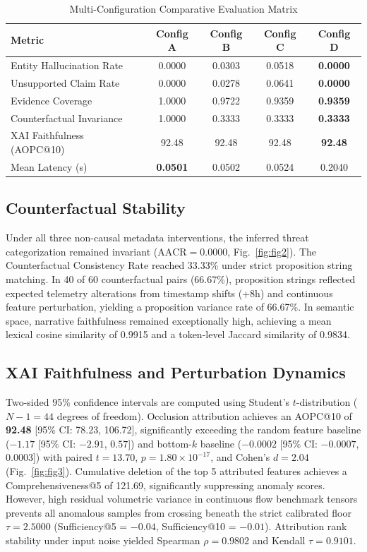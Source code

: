 \documentclass[conference]{IEEEtran}
\begin{document}
\begin{table}[t]
\caption{Multi-Configuration Comparative Evaluation Matrix}
\label{tab:comparison}
\centering
\begin{tabular}{lcccc}
\toprule
\textbf{Metric} & \textbf{Config A} & \textbf{Config B} & \textbf{Config C} & \textbf{Config D} \\
\midrule
Entity Hallucination Rate & 0.0000 & 0.0303 & 0.0518 & \textbf{0.0000} \\
Unsupported Claim Rate   & 0.0000 & 0.0278 & 0.0641 & \textbf{0.0000} \\
Evidence Coverage        & 1.0000 & 0.9722 & 0.9359 & \textbf{0.9359} \\
Counterfactual Invariance& 1.0000 & 0.3333 & 0.3333 & \textbf{0.3333} \\
XAI Faithfulness (AOPC@10)& 92.48  & 92.48  & 92.48  & \textbf{92.48}  \\
Mean Latency (s)         & \textbf{0.0501} & 0.0502 & 0.0524 & 0.2040 \\
\bottomrule
\end{tabular}
\end{table}

\subsection{Counterfactual Stability}
Under all three non-causal metadata interventions, the inferred threat categorization remained invariant ($\text{AACR} = 0.0000$, Fig.~\ref{fig:fig2}). The Counterfactual Consistency Rate reached 33.33\% under strict proposition string matching. In 40 of 60 counterfactual pairs (66.67\%), proposition strings reflected expected telemetry alterations from timestamp shifts (+8h) and continuous feature perturbation, yielding a proposition variance rate of 66.67\%. In semantic space, narrative faithfulness remained exceptionally high, achieving a mean lexical cosine similarity of 0.9915 and a token-level Jaccard similarity of 0.9834.

\subsection{XAI Faithfulness and Perturbation Dynamics}
Two-sided 95\% confidence intervals are computed using Student's $t$-distribution ($N - 1 = 44$ degrees of freedom). Occlusion attribution achieves an AOPC@10 of \textbf{92.48} [95\% CI: 78.23, 106.72], significantly exceeding the random feature baseline ($-1.17$ [95\% CI: $-2.91$, $0.57$]) and bottom-$k$ baseline ($-0.0002$ [95\% CI: $-0.0007$, $0.0003$]) with paired $t = 13.70$, $p = 1.80 \times 10^{-17}$, and Cohen's $d = 2.04$ (Fig.~\ref{fig:fig3}). Cumulative deletion of the top 5 attributed features achieves a Comprehensiveness@5 of 121.69, significantly suppressing anomaly scores. However, high residual volumetric variance in continuous flow benchmark tensors prevents all anomalous samples from crossing beneath the strict calibrated floor $\tau = 2.5000$ (Sufficiency@5 = $-0.04$, Sufficiency@10 = $-0.01$). Attribution rank stability under input noise yielded Spearman $\rho = 0.9802$ and Kendall $\tau = 0.9101$.
\end{document}

